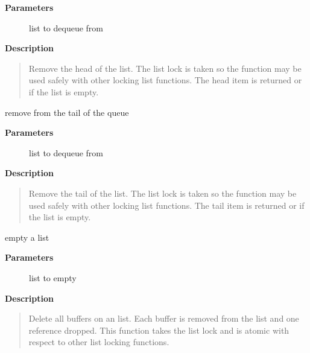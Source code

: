 \documentclass[a4paper,8pt,english]{sphinxmanual}
\begin{document}
\textbf{Parameters}
\begin{description}
\item[{}] \leavevmode
list to dequeue from

\end{description}

\textbf{Description}
\begin{quote}

Remove the head of the list. The list lock is taken so the function
may be used safely with other locking list functions. The head item is
returned or  if the list is empty.
\end{quote}

\begin{fulllineitems}
remove from the tail of the queue

\end{fulllineitems}


\textbf{Parameters}
\begin{description}
\item[{}] \leavevmode
list to dequeue from

\end{description}

\textbf{Description}
\begin{quote}

Remove the tail of the list. The list lock is taken so the function
may be used safely with other locking list functions. The tail item is
returned or  if the list is empty.
\end{quote}

\begin{fulllineitems}
empty a list

\end{fulllineitems}


\textbf{Parameters}
\begin{description}
\item[{}] \leavevmode
list to empty

\end{description}

\textbf{Description}
\begin{quote}

Delete all buffers on an {\hyperref[networking/kapi:c.sk_buff]{\emph{}}} list. Each buffer is removed from
the list and one reference dropped. This function takes the list
lock and is atomic with respect to other list locking functions.
\end{quote}
\end{document}
